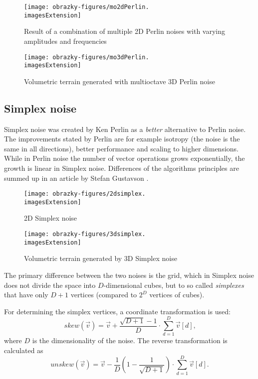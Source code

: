 \begin{figure}[H]
	\centering
	\begin{minipage}[t]{0.48\textwidth}
		\centering
		\texttt{[image: obrazky-figures/mo2dPerlin.\\imagesExtension]}
		\caption{Result of a combination of multiple 2D Perlin noises with varying amplitudes and frequencies}
	\end{minipage}
	\hfill
	\begin{minipage}[t]{0.48\textwidth}
		\centering
		\texttt{[image: obrazky-figures/mo3dPerlin.\\imagesExtension]}
		\caption{Volumetric terrain generated with multioctave 3D Perlin noise}
	\end{minipage}
\end{figure}

\subsection{Simplex noise}
Simplex noise was created by Ken Perlin \cite{Perlin2002} as a \textit{better} alternative to Perlin noise. The improvements stated by Perlin are for example isotropy (the noise is the same in all directions), better performance and scaling to higher dimensions. While in Perlin noise the number of vector operations grows exponentially, the growth is linear in Simplex noise. Differences of the algorithms principles are summed up in an article by Stefan Gustavson \cite{Gustavson2005}.

\begin{figure}[H]
	\centering
	\begin{minipage}[t]{0.48\textwidth}
		\centering
		\texttt{[image: obrazky-figures/2dsimplex.\\imagesExtension]}
		\caption{2D Simplex noise}
	\end{minipage}
	\hfill
	\begin{minipage}[t]{0.48\textwidth}
		\centering
		\texttt{[image: obrazky-figures/3dsimplex.\\imagesExtension]}
		\caption{Volumetric terrain generated by 3D Simplex noise}
	\end{minipage}
\end{figure}

The primary difference between the two noises is the grid, which in Simplex noise does not divide the space into $D$-dimensional cubes, but to so called \textit{simplexes} that have only $D+1$ vertices (compared to $2^D$ vertices of cubes).

For determining the simplex vertices, a coordinate transformation is used:
\begin{equation}
	skew(\vec{v}) = \vec{v} + \dfrac{\sqrt{D + 1} - 1}{D} \cdot \sum_{d = 1}^{D} \vec{v}[d] \text{,}
\end{equation}
where $D$ is the dimensionality of the noise. The reverse transformation is calculated as
\begin{equation}
	unskew(\vec{v}) = \vec{v} - \dfrac{1}{D} \left(1 - \dfrac{1}{\sqrt{D + 1}}\right) \cdot \sum_{d = 1}^{D} \vec{v}[d] \text{.}
\end{equation}

